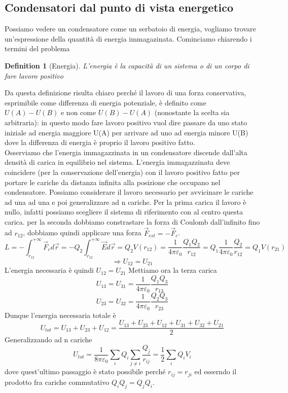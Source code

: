 \documentclass[10pt,a4paper]{article}
\newtheorem{definition}{Definition}
\begin{document}
\subsection{Condensatori dal punto di vista energetico}
Possiamo vedere un condensatore come un serbatoio di energia, vogliamo trovare un'espressione della quantità di energia immagazinata. Cominciamo chiarendo i termini del problema
\begin{definition}[Energia]
L'energia è la capacità di un sistema o di un corpo di fare lavoro positivo
\end{definition}
Da questa definizione risulta chiaro perché il lavoro di una forza conservativa, esprimibile come differenza di energia potenziale, è definito come \(U(A)-U(B)\) e non come \(U(B)-U(A)\) (nonostante la scelta sia arbitraria): in questo modo fare lavoro positivo vuol dire passare da uno stato iniziale ad energia maggiore U(A) per arrivare ad uno ad energia minore U(B) dove la differenza di energia è proprio il lavoro positivo fatto.\\
Osserviamo che l'energia immagazzinata in un condensatore discende dall'alta densità di carica in equilibrio nel sistema. L'energia immagazzinata deve coincidere (per la conservazione dell'energia) con il lavoro positivo fatto per portare le cariche da distanza infinita alla posizione che occupano nel condensatore. Possiamo considerare il lavoro necessario per avvicinare le cariche ad una ad una e poi generalizzare ad n cariche. Per la prima carica il lavoro è nullo, infatti possiamo scegliere il sistema di riferimento con al centro questa carica. per la seconda dobbiamo constrastare la forza di Coulomb dall'infinito fino ad \(r_{12}\), dobbiamo quindi applicare una forza $\vec{F}_{est} = -\vec{F}_{c}$.
\[L = -\int_{r_12}^{+\infty}\vec{F}_{c}d\vec{r} = -Q_2\int_{r_12}^{+\infty}\vec{E}d\vec{r} = Q_2V(r_{12}) = \frac{1}{4\pi\varepsilon_0}\frac{Q_1 Q_2}{r_{12}} = Q_1\frac{1}{4\pi\varepsilon_0}\frac{ Q_2}{r_{12}} = Q_1V(r_{21}) \]
\[\Rightarrow U_{12} = U_{21}\]
L'energia necessaria è quindi \(U_{12} = U_{21}\) 
Mettiamo ora la terza carica 
\[U_{13} = U_{31} = \frac{1}{4\pi\varepsilon_0}\frac{Q_1 Q_3}{r_{13}}\]
\[U_{23} = U_{32} = \frac{1}{4\pi\varepsilon_0}\frac{Q_2 Q_3}{r_{23}}\]
Dunque l'energia necessaria totale è 
\[U_{tot} =U_{13} + U_{23} + U_{12}  = \frac{U_{13} + U_{23} + U_{12} + U_{31} + U_{32} + U_{21}}{2}\]
Generalizzando ad n cariche
\[U_{tot} =\frac{1}{8\pi\varepsilon_0} \sum_i Q_i\sum_{j\neq i} \frac{Q_j}{r_{ij}} = \frac{1}{2}\sum_i Q_i V_i\]
dove quest'ultimo passaggio è stato possibile perché \(r_{ij} = r_{ji}\) ed esserndo il prodotto fra cariche commutativo \(Q_iQ_j = Q_jQ_i\).\\
\end{document}
